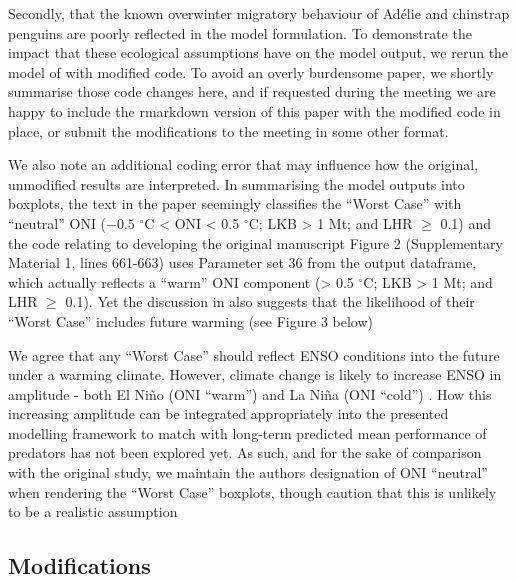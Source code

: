 \documentclass[]{elsarticle} %
\begin{document}
Secondly, that the known overwinter migratory behaviour of Adélie and
chinstrap penguins are poorly reflected in the model formulation. To
demonstrate the impact that these ecological assumptions have on the
model output, we rerun the model of \citet{Watters2020} with modified
code. To avoid an overly burdensome paper, we shortly summarise those
code changes here, and if requested during the meeting we are happy to
include the rmarkdown version of this paper with the modified code in
place, or submit the modifications to the meeting in some other format.

We also note an additional coding error that may influence how the
original, unmodified results are interpreted. In summarising the model
outputs into boxplots, the text in the paper seemingly classifies the
``Worst Case'' with ``neutral'' ONI (\({-0.5}\) \(^{\circ}\)C
\textless{} ONI \textless{} 0.5 \(^{\circ}\)C; LKB \textgreater{} 1 Mt;
and LHR \(\geqslant\) 0.1) and the code relating to developing the
original manuscript Figure 2 (Supplementary Material 1, lines 661-663)
uses Parameter set 36 from the output dataframe, which actually reflects
a ``warm'' ONI component (\textgreater{} 0.5 \(^{\circ}\)C; LKB
\textgreater{} 1 Mt; and LHR \(\geqslant\) 0.1). Yet the discussion in
\citet{Watters2020} also suggests that the likelihood of their ``Worst
Case'' includes future warming (see Figure 3 below)

We agree that any ``Worst Case'' should reflect ENSO conditions into the
future under a warming climate. However, climate change is likely to
increase ENSO in amplitude - both El Niño (ONI ``warm'') and La Niña
(ONI ``cold'') \citep{capotondiUnderstandingENSODiversity2015}. How this
increasing amplitude can be integrated appropriately into the presented
modelling framework to match with long-term predicted mean performance
of predators has not been explored yet. As such, and for the sake of
comparison with the original study, we maintain the authors designation
of ONI ``neutral'' when rendering the ``Worst Case'' boxplots, though
caution that this is unlikely to be a realistic assumption

\subsection{Modifications}\label{modifications}
\end{document}

